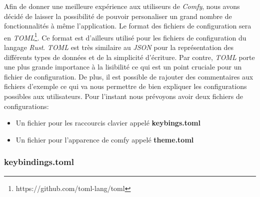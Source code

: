 \documentclass[titlepage]{article}
\begin{document}
\par
\bigskip
Afin de donner une meilleure expérience aux utiliseurs de \textit{Comfy}, nous
avons décidé de laisser la possibilité de pouvoir personaliser un grand nombre
de fonctionnalités à même l'application. Le format des fichiers de
configuration sera en
\textit{TOML}\footnote{https://github.com/toml-lang/toml}. Ce format est
d'ailleurs utilisé pour les fichiers de configuration du langage \textit{Rust}.
\textit{TOML} est très similaire au \textit{JSON} pour la représentation des
différents types de données et de la simplicité d'écriture.  Par contre,
\textit{TOML} porte une plus grande importance à la lisibilité ce qui est un
point cruciale pour un fichier de configuration. De plus, il est possible de
rajouter des commentaires aux fichiers d'exemple ce qui va nous permettre de
bien expliquer les configurations possibles aux utilisateurs. Pour l'instant
nous prévoyons avoir deux fichiers de configurations:
\begin{itemize}
    \item Un fichier pour les raccourcis clavier appelé \textbf{keybings.toml}
    \item Un fichier pour l'apparence de comfy appelé \textbf{theme.toml}
\end{itemize}

\subsubsection{keybindings.toml}
\begin{minipage}{\linewidth}
    
\end{minipage}
\end{document}
